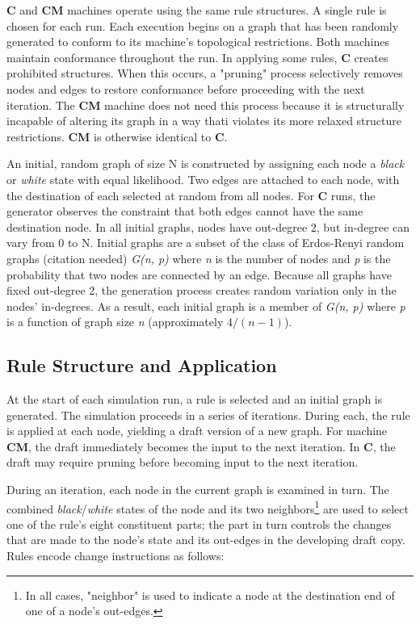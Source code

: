 \documentclass{tufte-handout}
\begin{document}
\textbf{C} and \textbf{CM} machines operate using the same rule structures.
A single rule is chosen for each run. Each execution
begins on a graph that has been randomly generated
to conform to its machine's topological restrictions. Both machines maintain conformance
throughout the run. In applying some rules, \textbf{C} creates prohibited
structures. When this occurs, a "pruning" process selectively
removes nodes and edges to restore conformance before proceeding with the
next iteration. The \textbf{CM} machine does not need this process because
it is structurally incapable of altering its graph in a way thati violates its more
relaxed structure restrictions. \textbf{CM} is otherwise identical to \textbf{C}.  

An initial, random graph of size N is constructed by assigning each node
a \textit{black} or \textit{white} state with equal likelihood.
Two edges are attached to each node, with
the destination of each selected at random from all nodes. For \textbf{C} runs, the
generator observes the constraint that both edges cannot have the same destination node.
In all initial graphs, nodes have out-degree 2, but in-degree can vary from 0 to N.
Initial graphs are a subset of the class of Erdos-Renyi random graphs (citation needed)
\textit{G(n, p)} where \textit{n} is the number of nodes and \textit{p} is the probability
that two nodes are connected by an edge. Because all graphs have fixed out-degree 2,
the generation process creates random variation only in the nodes' in-degrees. As a result,
each initial graph is a member of \textit{G(n, p)} where \textit{p} is a function
of graph size \textit{n} (approximately \( 4 / (n - 1) \)).

\subsection{Rule Structure and Application}

At the start of each simulation run, a rule is selected and an initial graph
is generated.  The simulation proceeds in a series of
iterations. During each, the rule is applied at each node, yielding a draft
version of a new graph. For machine \textbf{CM}, the draft immediately becomes
the input to the next iteration. In \textbf{C}, the draft may require pruning
before becoming input to the next iteration. 

During an iteration, each node in the current graph is examined in turn.
The combined \textit{black}/\textit{white} states of the node and its two neighbors\footnote{In
all cases, "neighbor" is used to indicate a node at the destination end of one of a node's out-edges.}
are used to select one of the rule's eight constituent parts; the part in turn
controls the changes that are made to the node's state and its out-edges in
the developing draft copy. Rules encode change instructions as follows:
\end{document}
